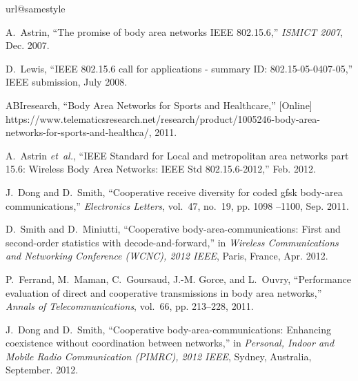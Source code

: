 \documentclass[12pt,draftcls,a4paper,onecolumn,journal]{IEEEtran}
\begin{document}
\FloatBarrier
\begin{thebibliography}{10}
\providecommand{\url}[1]{#1}
\csname url@samestyle\endcsname
\providecommand{\newblock}{\relax}
\providecommand{\bibinfo}[2]{#2}
\providecommand{\BIBentrySTDinterwordspacing}{\spaceskip=0pt\relax}
\providecommand{\BIBentryALTinterwordstretchfactor}{4}
\providecommand{\BIBentryALTinterwordspacing}{\spaceskip=\fontdimen2\font plus
\BIBentryALTinterwordstretchfactor\fontdimen3\font minus
  \fontdimen4\font\relax}
\providecommand{\BIBforeignlanguage}[2]{{\expandafter\ifx\csname l@#1\endcsname\relax
\typeout{** WARNING: IEEEtran.bst: No hyphenation pattern has been}\typeout{** loaded for the language `#1'. Using the pattern for}\typeout{** the default language instead.}\else
\language=\csname l@#1\endcsname
\fi
#2}}
\providecommand{\BIBdecl}{\relax}
\BIBdecl

A.~Astrin, ``The promise of body area networks {IEEE} 802.15.6,'' \emph{ISMICT
  2007}, Dec. 2007.

D.~Lewis, ``{IEEE} 802.15.6 call for applications - summary {ID:
  802.15-05-0407-05},'' IEEE submission, July 2008.

ABIresearch, ``{Body} {Area} {Networks} {for} {Sports} {and} {Healthcare},''
  [Online]
  \url{https://www.telematicsresearch.net/research/product/1005246-body-area-networks-for-sports-and-healthca/},
  2011.

A.~Astrin \emph{et~al.}, ``{IEEE} {Standard} for {Local} and metropolitan area
  networks part 15.6: {Wireless} {Body} {Area} {Networks}: {{IEEE} Std
  802.15.6-2012},'' Feb. 2012.

J.~Dong and D.~Smith, ``Cooperative receive diversity for coded gfsk body-area
  communications,'' \emph{Electronics Letters}, vol.~47, no.~19, pp. 1098
  --1100, Sep. 2011.

D.~Smith and D.~Miniutti, ``Cooperative body-area-communications: First and
  second-order statistics with decode-and-forward,'' in \emph{Wireless
  Communications and Networking Conference (WCNC), 2012 {IEEE}}, Paris, France,
  Apr. 2012.

P.~Ferrand, M.~Maman, C.~Goursaud, J.-M. Gorce, and L.~Ouvry, ``Performance
  evaluation of direct and cooperative transmissions in body area networks,''
  \emph{Annals of Telecommunications}, vol.~66, pp. 213--228, 2011.

J.~Dong and D.~Smith, ``Cooperative body-area-communications: Enhancing
  coexistence without coordination between networks,'' in \emph{Personal,
  Indoor and Mobile Radio Communication (PIMRC), 2012 {IEEE}}, Sydney,
  Australia, September. 2012.


\end{thebibliography}
\end{document}
